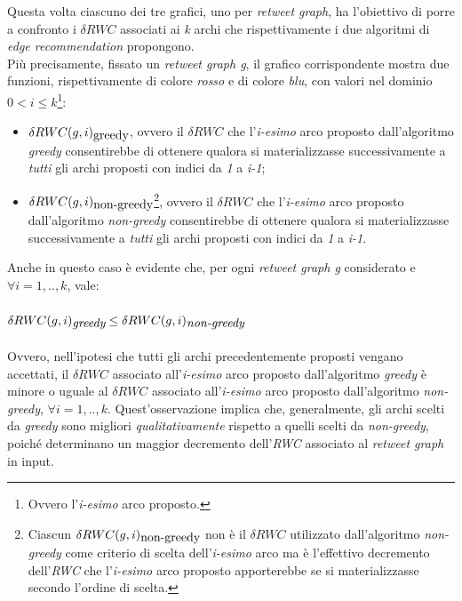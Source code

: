 


Questa volta ciascuno dei tre grafici, uno per \textit{retweet graph}, ha l'obiettivo di porre a confronto i \textit{$\delta RWC$} associati ai \textit{k} archi che rispettivamente i due algoritmi di \textit{edge recommendation} propongono.
\\Più precisamente, fissato un \textit{retweet graph g}, il grafico corrispondente mostra due funzioni, rispettivamente di colore \textit{rosso} e di colore \textit{blu}, con valori nel dominio \textit{$0 < i \leq k$}\footnote{Ovvero l'\textit{i-esimo} arco proposto.}:
\begin{itemize}
\item \textit{$\delta RWC(g,i)\textsubscript{greedy}$}, ovvero il \textit{$\delta RWC$} che l'\textit{i-esimo} arco proposto dall'algoritmo \textit{greedy} consentirebbe di ottenere qualora si materializzasse successivamente a \textit{tutti} gli archi proposti con indici da \textit{1} a \textit{i-1};
\item \textit{$\delta RWC(g,i)\textsubscript{non-greedy}$}\footnote{Ciascun \textit{$\delta RWC(g,i)\textsubscript{non-greedy}$} non è il \textit{$\delta RWC$} utilizzato dall'algoritmo \textit{non-greedy} come criterio di scelta dell'\textit{i-esimo} arco ma è l'effettivo decremento dell'\textit{RWC} che l'\textit{i-esimo} arco proposto apporterebbe se si materializzasse secondo l'ordine di scelta.}, ovvero il \textit{$\delta RWC$} che l'\textit{i-esimo} arco proposto dall'algoritmo \textit{non-greedy} consentirebbe di ottenere qualora si materializzasse successivamente a \textit{tutti} gli archi proposti con indici da \textit{1} a \textit{i-1}.
\end{itemize}
Anche in questo caso è evidente che, per ogni \textit{retweet graph g} considerato e $\forall i = 1,..,k$, vale:
\\\\
$\textit{$\delta RWC(g,i)\textsubscript{greedy}$} \leq \textit{$\delta RWC(g,i)\textsubscript{non-greedy}$}$
\\\\
Ovvero, nell'ipotesi che tutti gli archi precedentemente proposti vengano accettati, il \textit{$\delta RWC$} associato all'\textit{i-esimo} arco proposto dall'algoritmo \textit{greedy} è minore o uguale al \textit{$\delta RWC$} associato all'\textit{i-esimo} arco proposto dall'algoritmo \textit{non-greedy}, $\forall i = 1,..,k$. Quest'osservazione implica che, generalmente, gli archi scelti da \textit{greedy} sono migliori \textit{qualitativamente} rispetto a quelli scelti da \textit{non-greedy}, poiché determinano un maggior decremento dell'\textit{RWC} associato al \textit{retweet graph} in input.
